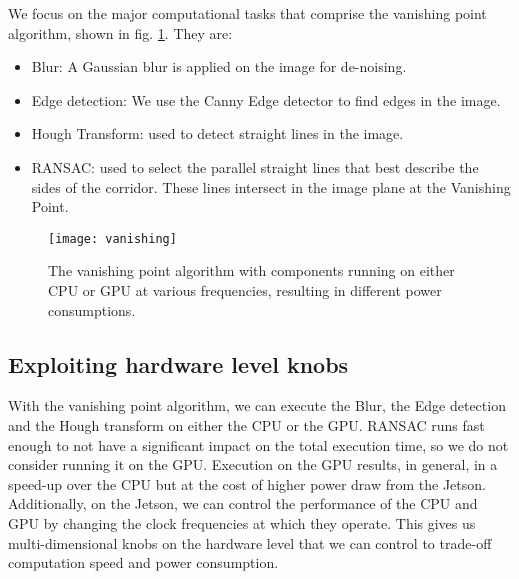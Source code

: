 We focus on the major computational tasks that comprise the vanishing point algorithm, shown in fig. \ref{fig:vanishing}.
They are:

\begin{itemize}
\item Blur: A Gaussian blur is applied on the image for de-noising.
\item Edge detection: We use the Canny Edge detector to find edges in the image.
\item Hough Transform: used to detect straight lines in the image.
\item RANSAC: used to select the parallel straight lines that best describe the sides of the corridor. These lines intersect in the image plane at the Vanishing Point.
\end{itemize}

\begin{figure}
	\centering
	\label{fig:vanishing}
	\texttt{[image: vanishing]}
	\caption{The vanishing point algorithm with components running on either CPU or GPU at various frequencies, resulting in different power consumptions.}
\end{figure}
\subsection{Exploiting hardware level knobs}
With the vanishing point algorithm, we can execute the Blur, the Edge detection and the Hough transform on either the CPU or the GPU. 
RANSAC runs fast enough to not have a significant impact on the total execution time, so we do not consider running it on the GPU.
Execution on the GPU results, in general, in a speed-up over the CPU but at the cost of higher power draw from the Jetson. 
Additionally, on the Jetson, we can control the performance of the CPU and GPU by changing the clock frequencies at which they operate. 
This gives us multi-dimensional knobs on the hardware level that we can control to trade-off computation speed and power consumption.




